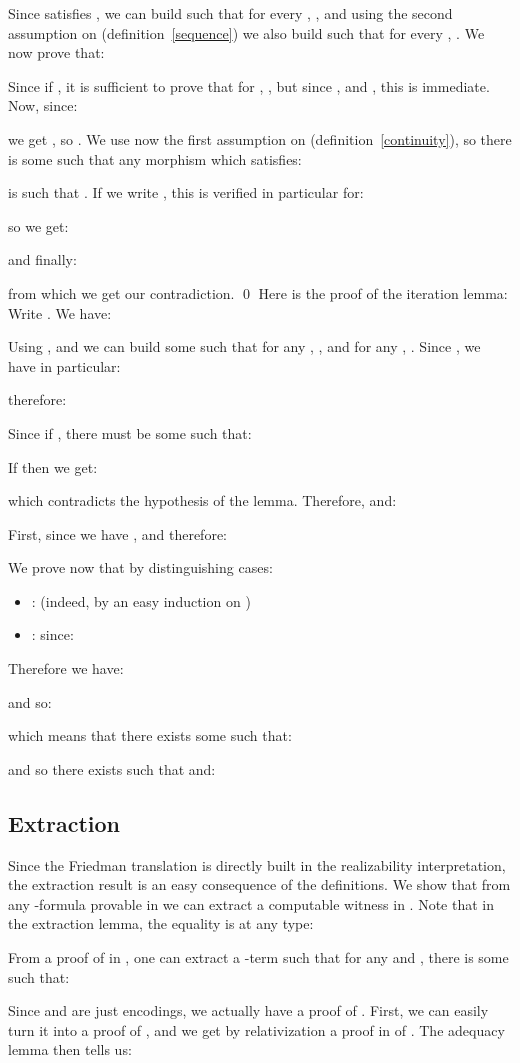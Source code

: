 \documentclass{CSML}
\begin{document}
Since  satisfies , we can build  such that for every , , and using the second assumption on  (definition~\ref{sequence}) we also build  such that for every , . We now prove that:

Since  if , it is sufficient to prove that for , , but since ,  and , this is immediate. Now, since:

we get , so . We use now the first assumption on  (definition~\ref{continuity}), so there is some  such that any morphism  which satisfies:

is such that . If we write , this is verified in particular for:

so we get:

and finally:

from which we get our contradiction.
\qed
Here is the proof of the iteration lemma:
\proof
Write . We have:

Using ,  and  we can build some  such that for any , , and for any , . Since , we have in particular:

therefore:

Since  if , there must be some  such that:

If  then we get:

which contradicts the hypothesis of the lemma. Therefore,  and:

First, since  we have , and therefore:

We prove now that  by distinguishing cases:
\begin{itemize}
\item:  (indeed,  by an easy induction on )
\item:  since:

\end{itemize}
Therefore we have:

and so:

which means that there exists some  such that:

and so there exists  such that  and:


\subsection{Extraction}
Since the Friedman translation is directly built in the realizability interpretation, the extraction result is an easy consequence of the definitions. We show that from any -formula provable in  we can extract a computable witness in . Note that in the extraction lemma, the equality  is at any type:
\begin{lem}
From a proof of  in , one can extract a -term  such that for any  and , there is some  such that:

\end{lem}
\proof
Since  and  are just encodings, we actually have a proof of . First, we can easily turn it into a proof of , and we get by relativization a proof  in  of . The adequacy lemma then tells us:
\end{document}
